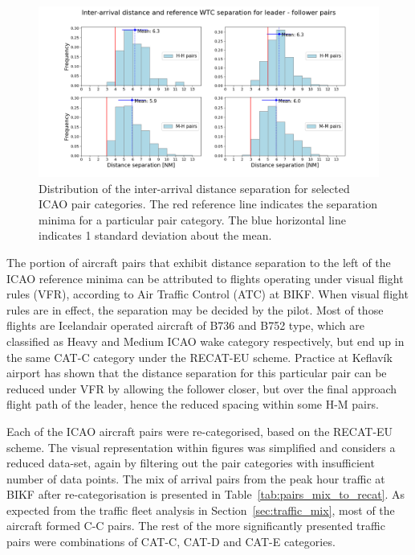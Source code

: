 \begin{figure}[h]
    \centering
    \includegraphics[width=1\textwidth]{graphics/fig_dist_separ_HH_HM_MH_MM_pairs.png}
    \caption[Inter-arrival distance separation, main ICAO pairs]{Distribution of the inter-arrival distance separation for selected ICAO pair categories. The red reference line indicates the separation minima for a particular pair category. The blue horizontal line indicates 1 standard deviation about the mean.}
    \label{fig:dist_separ_HH_HM_MH_MM_pairs}
\end{figure}

The portion of aircraft pairs that exhibit distance separation to the left of the ICAO reference minima can be attributed to flights operating under visual flight rules (VFR), according to Air Traffic Control (ATC) at BIKF. When visual flight rules are in effect, the separation may be decided by the pilot. Most of those flights are Icelandair operated aircraft of B736 and B752 type, which are classified as Heavy and Medium ICAO wake category respectively, but end up in the same CAT-C category under the  RECAT-EU scheme. Practice at Keflavík airport has shown that the distance separation for this particular pair can be reduced under VFR by allowing the follower closer, but over the final approach flight path of the leader, hence the reduced spacing within some H-M pairs.

Each of the ICAO aircraft pairs were re-categorised, based on the RECAT-EU scheme. The visual representation within figures was simplified and considers a reduced data-set, again by filtering out the pair categories with insufficient number of data points. The mix of arrival pairs from the peak hour traffic at BIKF after re-categorisation is presented in Table~\ref{tab:pairs_mix_to_recat}. As expected from the traffic fleet analysis in Section~\ref{sec:traffic_mix}, most of the aircraft formed C-C pairs. The rest of the more significantly presented traffic pairs were combinations of CAT-C, CAT-D and CAT-E categories. 

